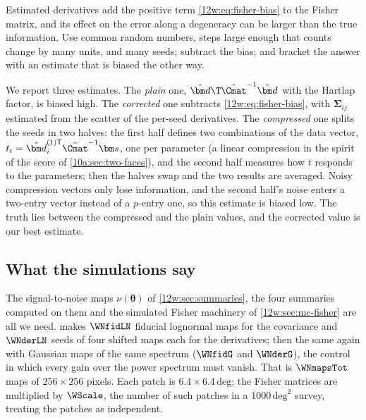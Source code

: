 \begin{pitfall}
Estimated derivatives add the positive term \eqref{12w:eq:fisher-bias} to the Fisher matrix, and its effect on the
error along a degeneracy can be larger than the true information. Use common random numbers, steps large enough that
counts change by many units, and many seeds; subtract the bias; and bracket the answer with an estimate that is biased
the other way.
\end{pitfall}

We report three estimates. The \emph{plain} one, $\hat{\bm d}\T\hat\Cmat^{-1}\hat{\bm d}$ with the Hartlap factor, is
biased high. The \emph{corrected} one subtracts \eqref{12w:eq:fisher-bias}, with $\bm\Sigma_{ij}$ estimated from the
scatter of the per-seed derivatives. The \emph{compressed} one splits the seeds in two halves: the first half
defines two combinations of the data vector, $t_i=\hat{\bm d}_i^{(1)\mathsf T}\hat\Cmat^{-1}\bm s$, one per parameter
(a linear compression in the spirit of the score of \cref{10a:sec:two-faces}), and the second half measures how $t$
responds to the parameters; then the halves swap and the two results are averaged. Noisy compression vectors only lose
information, and the second half's noise enters a two-entry vector instead of a $p$-entry one, so this estimate is
biased low. The truth lies between the compressed and the plain values, and the corrected value is our best estimate.

\subsection{What the simulations say}
\label{12w:sec:beyond-results}

The signal-to-noise maps $\nu(\bm\theta)$ of \cref{12w:sec:summaries}, the four summaries computed on them and the
simulated Fisher machinery of \cref{12w:sec:mc-fisher} are all we need.  makes
$\WNfidLN$ fiducial lognormal maps for the covariance and $\WNderLN$ seeds of four shifted maps each for the
derivatives; then the same again with Gaussian maps of the same spectrum ($\WNfidG$ and $\WNderG$), the control in
which every gain over the power spectrum must vanish. That is $\WNmapsTot$ maps of $256\times256$ pixels. Each patch
is $6.4\times6.4\,\mathrm{deg}$; the Fisher matrices are multiplied by $\WScale$, the number of such patches in a
$1000\,\mathrm{deg}^2$ survey, treating the patches as independent.

